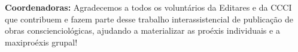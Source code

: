 \documentclass{gescons}
\begin{document}
\begin{multicols}{2}

\textbf{Coordenadoras:} Agradecemos a todos os voluntários da Editares e da CCCI que contribuem e fazem parte desse trabalho interassistencial de publicação de obras conscienciológicas, ajudando a materializar as proéxis individuais e a maxiproéxis grupal!





        
    \end{multicols}



\end{document}
